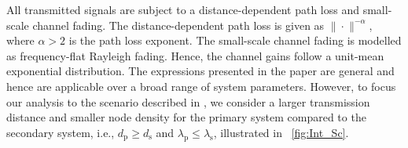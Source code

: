 \documentclass[conference, twocolumn]{IEEEtran}
\newcommand{\sub}[1]{_{\text{#1}}}
\newtheorem{case}{Case}
\begin{document}
All transmitted signals are subject to a distance-dependent path loss and small-scale channel fading. The distance-dependent path loss is given as $\| \cdot \|^{-\alpha}$, where $\alpha>2$ is the path loss exponent. The small-scale channel fading is modelled as frequency-flat Rayleigh fading. Hence, the channel gains follow a unit-mean exponential distribution. The expressions presented in the paper are general and hence are applicable over a broad range of system parameters. However, to focus our analysis to the scenario described in \cite{Kaushik13}, we consider a larger transmission distance and smaller node density for the primary system compared to the secondary system, i.e., $d\sub{p} \ge d\sub{s}$ and $\lambda\sub{p} \le \lambda\sub{s}$, illustrated in \figurename~\ref{fig:Int_Sc}. %
\end{document}
